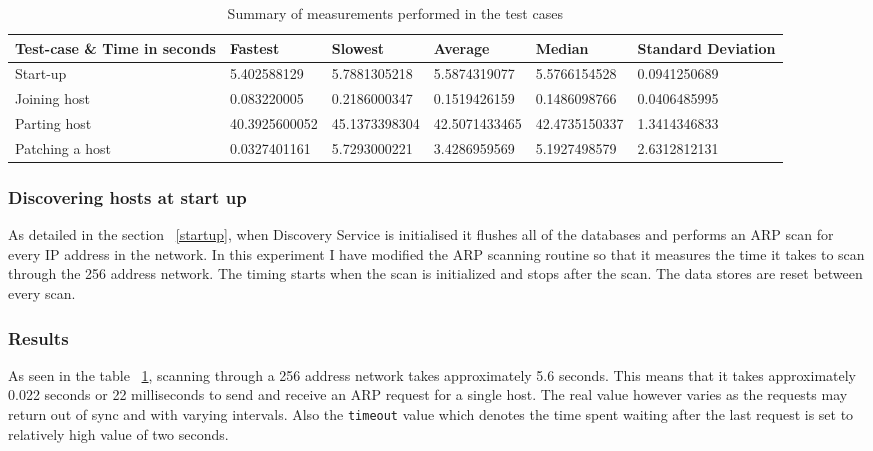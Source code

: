\begin{landscape}
\begin{table}
\centering
\begin{tabular}{ | l || l | l | l | l | l |}
\hline 
Test-case \& Time in seconds & Fastest & Slowest & Average & Median & Standard Deviation \\
\hline \hline
Start-up & 5.402588129 & 5.7881305218 & 5.5874319077 & 5.5766154528 & 0.0941250689 \\
\hline
Joining host & 0.083220005 & 0.2186000347 & 0.1519426159 & 0.1486098766 & 0.0406485995 \\
\hline 
Parting host & 40.3925600052 & 45.1373398304 & 42.5071433465 & 42.4735150337 & 1.3414346833 \\
\hline
Patching a host & 0.0327401161 & 5.7293000221 & 3.4286959569 & 5.1927498579 & 2.6312812131 \\ 
\hline
\end{tabular}
\caption{Summary of measurements performed in the test cases}
\label{table:measurements}
\end{table}
\end{landscape}

\subsubsection{Discovering hosts at start up}

As detailed in the section ~\ref{startup}, when Discovery Service is initialised it flushes all of the databases and performs an ARP scan for every IP address in the network. In this experiment I have modified the ARP scanning routine so that it measures the time it takes to scan through the 256 address network. The timing starts when the scan is initialized and stops after the scan. The data stores are reset between every scan.

\subsubsection*{Results}

As seen in the table ~\ref{table:measurements}, scanning through a 256 address network takes approximately 5.6 seconds. This means that it takes approximately 0.022 seconds or 22 milliseconds to send and receive an ARP request for a single host. The real value however varies as the requests may return out of sync and with varying intervals. Also the \verb|timeout| value which denotes the time spent waiting after the last request is set to relatively high value of two seconds.

